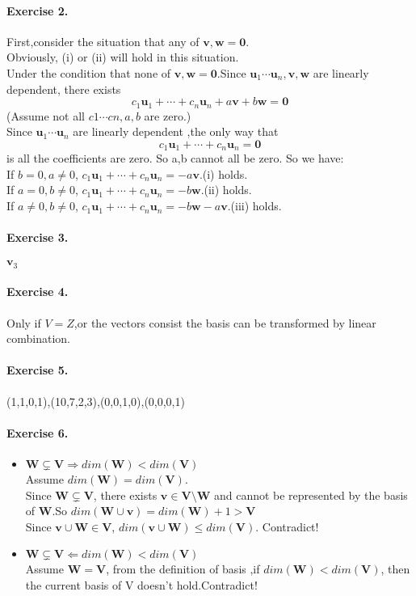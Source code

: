 \documentclass{article}
\begin{document}
\paragraph{Exercise 2.}
First,consider the situation that any of $\mathbf{v},\mathbf{w}=\mathbf{0}$.\\Obviously, (i) or (ii) will hold in this situation.\\
Under the condition that none of $\mathbf{v},\mathbf{w}=\mathbf{0}$.Since $\mathbf{u}_1\cdots\mathbf{u}_n,\mathbf{v},\mathbf{w}$ are linearly dependent, there exists 
\[
    c_1\mathbf{u}_1+\cdots+c_n\mathbf{u}_n+a\mathbf{v}+b\mathbf{w}=\mathbf{0} 
\]
(Assume not all $c1 \cdots cn,a,b$ are zero.)\\
Since $\mathbf{u}_1\cdots\mathbf{u}_n$ are linearly dependent ,the only way that
\[
    c_1\mathbf{u}_1+\cdots+c_n\mathbf{u}_n=\mathbf{0} 
\]
is all the coefficients are zero. So a,b cannot all be zero. So we have:\\
If $b=0,a\neq 0$, $c_1\mathbf{u}_1+\cdots+c_n\mathbf{u}_n=-a\mathbf{v}$.(i) holds.\\
If $a=0,b\neq 0$, $c_1\mathbf{u}_1+\cdots+c_n\mathbf{u}_n=-b\mathbf{w}$.(ii) holds.\\
If $a\neq 0,b\neq 0$, $c_1\mathbf{u}_1+\cdots+c_n\mathbf{u}_n=-b\mathbf{w}-a\mathbf{v}$.(iii) holds.

\paragraph{Exercise 3.}$\mathbf{v}_3$
\paragraph{Exercise 4.}Only if $V=Z$,or the vectors consist the basis can be transformed by linear combination.
\paragraph{Exercise 5.}(1,1,0,1),(10,7,2,3),(0,0,1,0),(0,0,0,1)
\paragraph{Exercise 6.}\begin{itemize}
\item $\mathbf{W} \subsetneq \mathbf{V} \Rightarrow dim(\mathbf{W}) < dim(\mathbf{V})$\\
    Assume $dim(\mathbf{W}) = dim(\mathbf{V})$.\\ Since $\mathbf{W} \subsetneq \mathbf{V}$, there exists $\mathbf{v} \in \mathbf{V} \setminus \mathbf{W}$ and cannot be represented by the basis of $\mathbf{W}$.So $dim(\mathbf{W}\cup \mathbf{v})=dim(\mathbf{W})+1>\mathbf{V}$\\
    Since $\mathbf{v} \cup \mathbf{W} \in \mathbf{V}$, $dim(\mathbf{v} \cup \mathbf{W} ) \leq dim (\mathbf{V})$. Contradict!
\item $\mathbf{W} \subsetneq \mathbf{V} \Leftarrow dim(\mathbf{W}) < dim(\mathbf{V})$\\
    Assume $\mathbf{W}=\mathbf{V}$, from the definition of basis ,if $dim(\mathbf{W}) < dim(\mathbf{V})$, then the current basis of V doesn't hold.Contradict!
\end{itemize} 
\end{document}
